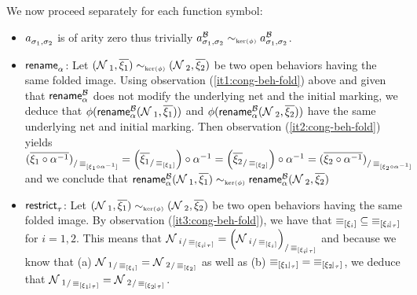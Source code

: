 \begin{proofE}
  We now proceed separately for each \hrtext{} function symbol: 
  \begin{itemize}
    \item $\sgraph{a}{\asrc_1}{\asrc_2}{}$
      is of arity zero thus trivially 
      $\sgraph{a}{\asrc_1}{\asrc_2}{\algof{B}} \kerof{\afold} \sgraph{a}{\asrc_1}{\asrc_2}{\algof{B}}$.
    \item $\rename{\alpha}{}$: Let
      $(\amarkednet_{~1},\overline{\sources_1}) \kerof{\afold}
      (\amarkednet_{~2},\overline{\sources_2})$ be two open behaviors
      having the same folded image. Using observation
      (\ref{it1:cong-beh-fold}) above and given that
      $\rename{\alpha}{\algof{B}}$ does not modify the underlying net
      and the initial marking, we deduce that
      $\foldof{\rename{\alpha}{\algof{B}}(\amarkednet_{~1},\overline{\sources_1})}$
      and
      $\foldof{\rename{\alpha}{\algof{B}}(\amarkednet_{~2},\overline{\sources_2})}$
      have the same underlying net and initial marking. Then
      observation (\ref{it2:cong-beh-fold}) yields
      ${(\overline{\sources_1\circ\alpha^{-1}})}_{/\foldrel{\sources_1\circ\alpha^{-1}}}
      =
      \left({\overline{\sources_1}}_{/\foldrel{\sources_1}}\right) \circ\alpha^{-1}
      =
      \left({\overline{\sources_2}}_{/\foldrel{\sources_2}}\right) \circ\alpha^{-1}
      =
      {(\overline{\sources_2\circ\alpha^{-1}})}_{/\foldrel{\sources_2\circ\alpha^{-1}}}$
      and we conclude that
      $\rename{\alpha}{\algof{B}}(\amarkednet_{~1},\overline{\sources_1})
      \kerof{\afold}
      \rename{\alpha}{\algof{B}}(\amarkednet_{~2},\overline{\sources_2})$
    \item $\restrict{\slabs}{}$: Let
      $(\amarkednet_{~1},\overline{\sources_1}) \kerof{\afold}
      (\amarkednet_{~2},\overline{\sources_2})$ be two open behaviors
      having the same folded image. By observation
      (\ref{it3:cong-beh-fold}), we have that $\foldrel{\sources_i}
      \subseteq \foldrel{\proj{\sources_i}{\tau}}$ for $i = 1,2$.
      This means that
      ${\amarkednet_{~i}}_{/\foldrel{\proj{\sources_i}{\tau}}}
      =
      {\left({\amarkednet_{~i}}_{/\foldrel{\sources_i}}\right)}_{/\foldrel{\proj{\sources_i}{\tau}}}$
      and because we know that (a)
      ${\amarkednet_{~1}}_{/\foldrel{\sources_i}} =
      {\amarkednet_{~2}}_{/\foldrel{\sources_2}}$ as well as
      (b) $\foldrel{\proj{\sources_1}{\tau}} =
      \foldrel{\proj{\sources_2}{\tau}}$, we deduce that
      ${\amarkednet_{~1}}_{/\foldrel{\proj{\sources_1}{\tau}}}
      =
      {\amarkednet_{~2}}_{/\foldrel{\proj{\sources_2}{\tau}}}$.

\end{itemize}
\end{proofE}
